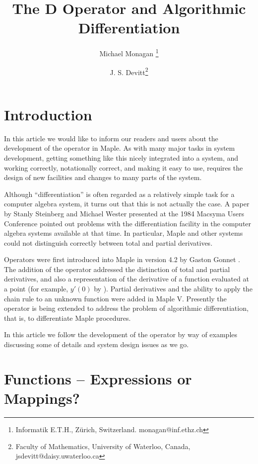 \documentclass[11pt,dvips]{mtn}
\begin{document}
%
\title{The D Operator and Algorithmic \\ Differentiation}
\author{Michael Monagan
\thanks{Informatik E.T.H., Z\"{u}rich, Switzerland. monagan@inf.ethz.ch}
\and J. S. Devitt\thanks{Faculty  of Mathematics, University of Waterloo, 
Canada, jsdevitt@daisy.uwaterloo.ca}
}
\maketitle

\section{Introduction}
In this article we would like to inform our readers and users about
the development of the  operator in Maple.
As with many major tasks in system development, getting something like
this nicely integrated into a system, and working correctly,
notationally correct, and making it easy to use, requires the design
of new facilities and changes to many parts of the system.

Although ``differentiation'' is often regarded as a
relatively simple task for a computer algebra system, it turns
out that this is not actually the case.
A paper by Stanly Steinberg and Michael Wester {\cite {MUC84}} presented
at the 1984 Macsyma Users Conference pointed out problems with
the differentiation facility in the computer algebra systems available
at that time.  In particular, Maple and other systems could not distinguish
correctly between total and partial derivatives.

Operators were first introduced into Maple in version 4.2
by Gaston Gonnet {\cite {OPERATORS}}.  The addition of the  operator
addressed the distinction of total and partial derivatives, and also
a representation of the derivative of a function evaluated at a
point (for example, $y'(0)$ by ).  
Partial derivatives and the ability to
apply the chain rule to an unknown function were added in Maple V.
Presently the  operator is being extended to address the
problem of algorithmic differentiation, that is, to differentiate
Maple procedures.

In this article we follow the development of the  operator
by way of examples discussing some of details and system design
issues as we go.

\section{Functions -- Expressions or Mappings?}
\end{document}

